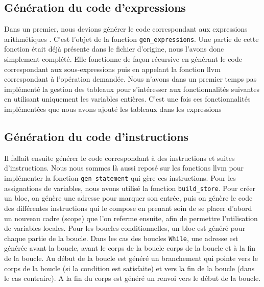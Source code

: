 \documentclass[french]{article}
\begin{document}
  \subsection{Génération du code d'expressions}
Dans un premier, nous devions générer le code correspondant aux expressions arithmétiques . C'est l'objet de la fonction \texttt{gen\_expressions}. Une partie de cette fonction était déjà présente dans le fichier d'origine, nous l'avons donc simplement complété. Elle fonctionne de façon récursive en générant le code correspondant aux sous-expressions puis en appelant la fonction llvm correspondant à l'opération demandée. Nous n'avons dans un premier temps pas implémenté la gestion des tableaux pour s’intéresser aux fonctionnalités suivantes en utilisant uniquement les variables entières. C'est une fois ces fonctionnalités implémentées que nous avons ajouté les tableaux dans les expressions
  \subsection{Génération du code d'instructions}
Il fallait ensuite générer le code correspondant à des instructions et suites d'instructions. Nous nous sommes là aussi reposé sur les fonctions llvm pour implémenter la fonction \texttt{gen\_statement} qui gère ces instructions. Pour les assignations de variables, nous avons utilisé la fonction \texttt{build\_store}. Pour créer un bloc, on génère une adresse pour marquer son entrée, puis on génère le code des différentes instructions qui le compose en prenant soin de se placer d'abord un nouveau cadre (scope) que l'on referme ensuite, afin de permettre l'utilisation de variables locales. Pour les boucles conditionnelles, un bloc est généré pour chaque partie de la boucle.
Dans les cas des boucles \texttt{While}, une adresse est générée avant la boucle, avant le corps de la boucle corps de la boucle et à la fin de la boucle. Au début de la boucle est généré un branchement qui pointe vers le corps de la boucle (si la condition est satisfaite) et vers la fin de la boucle (dans le cas contraire). A la fin du corps est généré un renvoi vers le début de la boucle.
\end{document}
